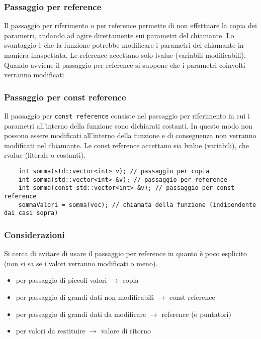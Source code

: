 \documentclass[a4paper]{article}
\begin{document}
\subsubsection*{Passaggio per reference}
Il passaggio per riferimento o per reference permette di non effettuare la copia dei parametri, andando ad agire direttamente sui
parametri del chiamante. Lo svantaggio è che la funzione potrebbe modificare i parametri del chiamante in maniera inaspettata. Le
reference accettano solo lvalue (variabili modificabili). Quando avviene il passaggio per reference si suppone che i parametri
coinvolti verranno modificati.

\subsubsection*{Passaggio per const reference}
Il passaggio per \verb|const reference| consiste nel passaggio per riferimento in cui i parametri all'interno della funzione
sono dichiarati costanti. In questo modo non possono essere modificati all'interno della funzione e di conseguenza non verranno
modificati nel chiamante. Le const reference accettano sia lvalue (variabili), che rvalue (literals o costanti).

\begin{lstlisting}
	int somma(std::vector<int> v); // passaggio per copia
	int somma(std::vector<int> &v); // passaggio per reference
	int somma(const std::vector<int> &v); // passaggio per const reference
	sommaValori = somma(vec); // chiamata della funzione (indipendente dai casi sopra)
\end{lstlisting}

\subsubsection*{Considerazioni}
Si cerca di evitare di usare il passaggio per reference in quanto è poco esplicito (non si sa se i valori verranno modificati o
meno).

\begin{itemize}
	\item per passaggio di piccoli valori \(\rightarrow\) copia
	\item per passaggio di grandi dati non modificabili \(\rightarrow\) const reference
	\item per passaggio di grandi dati da modificare \(\rightarrow\) reference (o puntatori)
	\item per valori da restituire \(\rightarrow\) valore di ritorno
\end{itemize}
\end{document}
